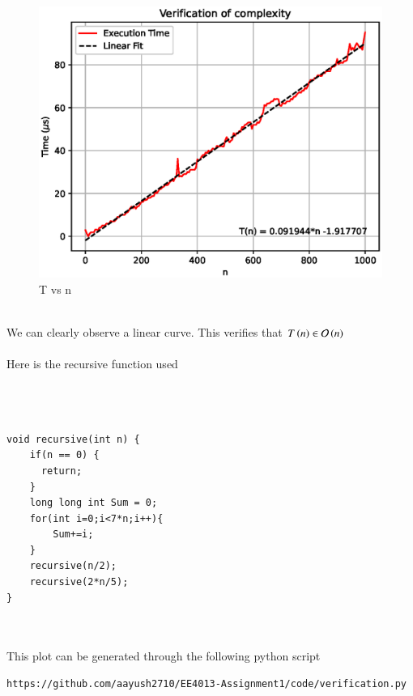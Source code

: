 \documentclass[journal,12pt,twocolumn]{IEEEtran}
\begin{document}
\begin{figure}[!h]
    \centering
    \includegraphics[scale=0.55]{figs/plot.eps}
    \caption{T vs n}
    \label{fig:verification}
\end{figure}
\\
We can clearly observe a linear curve. This verifies that 
$T\left(n\right) \in \mathcal{O}\left(n\right)$
\\
\\
Here is the recursive function used
\\
\\
\\ \\
\begin{lstlisting}
void recursive(int n) {
    if(n == 0) {
      return;
    }
    long long int Sum = 0;
    for(int i=0;i<7*n;i++){ 
        Sum+=i;
    }
    recursive(n/2);
    recursive(2*n/5);
}
\end{lstlisting}
\\
\\
This plot can be generated through the following python script
\begin{lstlisting}
https://github.com/aayush2710/EE4013-Assignment1/code/verification.py
\end{lstlisting}
\end{document}
